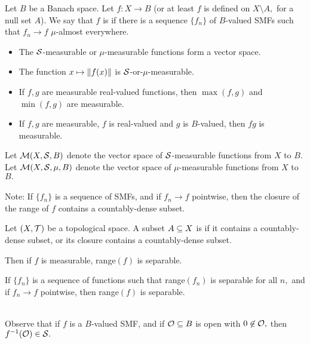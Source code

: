 \begin{defn}
Let $B$ be a Banach space. Let $f:X\rightarrow B$ (or at least $f$ is defined on $X\setminus A,$ for a null set $A$). We say that $f$ is  if there is a sequence $\{f_n\}$ of $B$-valued SMFs such that $f_n\rightarrow f$ $\mu$-almost everywhere.
\end{defn}

\noindent\begin{itemize}
\item The $\mathcal{S}$-measurable or $\mu$-measurable functions form a vector space.
\item The function $x\mapsto\left\lVert f(x)\right\rVert$ is $\mathcal{S}$-or-$\mu$-measurable.
\item If $f,g$ are measurable real-valued functions, then $\max(f,g)$ and $\min(f,g)$ are measurable.
\item If $f,g$ are measurable, $f$ is real-valued and $g$ is $B$-valued, then $fg$ is measurable.
\end{itemize}

\noindent Let $\mathcal{M}(X,\mathcal{S},B)$ denote the vector space of $\mathcal{S}$-measurable functions from $X$ to $B.$ \\ Let $\mathcal{M}(X,\mathcal{S},\mu,B)$ denote the vector space of $\mu$-measurable functions from $X$ to $B.$ \\ \\
Note: If $\{f_n\}$ is a sequence of SMFs, and if $f_n\rightarrow f$ pointwise, then the closure of the range of $f$ contains a countably-dense subset.

\begin{defn} 
Let $(X,\mathcal{T})$ be a topological space. A subset $A\subseteq X$ is  if it contains a countably-dense subset, or its closure contains a countably-dense subset.
\end{defn}

\noindent Then if $f$ is measurable, range$(f)$ is separable.

\begin{prop}
If $\{f_n\}$ is a sequence of functions such that range$(f_n)$ is separable for all $n,$ and if $f_n\rightarrow f$ pointwise, then range$(f)$ is separable. \\ \\
\end{prop}

\noindent Observe that if $f$ is a $B$-valued SMF, and if $\mathcal{O}\subseteq B$ is open with $0\not\in\mathcal{O},$ then $f^{-1}(\mathcal{O})\in\mathcal{S}.$

